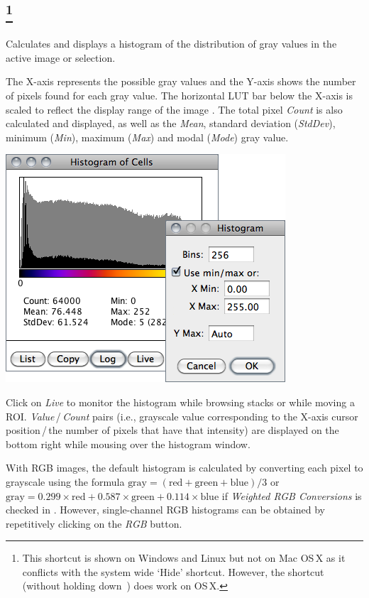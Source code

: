 \subsection[{\protect\userinterface{Histogram {[}h{]}}}]{\protect{}%
\footnote{This shortcut is shown on Windows and Linux but not on Mac OS\,X
as it conflicts with the system wide `Hide' shortcut. However, the
\protect{} shortcut (without holding down \protect{}\,)
does work on OS\,X.%
}\label{sub:Histogram}}

Calculates and displays a histogram of the distribution of gray values
in the active image or selection.

The X-axis represents the possible gray values and the Y-axis shows
the number of pixels found for each gray value. The horizontal LUT
bar below the X-axis is scaled to reflect the display range of the
image \cite{C-Histogram}. The total pixel \emph{Count} is also calculated
and displayed, as well as the \emph{Mean}, standard deviation (\emph{StdDev}),
minimum (\emph{Min}), maximum (\emph{Max}) and modal (\emph{Mode})
gray value.

\begin{minipage}[c][1\totalheight][t]{0.537\columnwidth}%
\includegraphics[scale=0.55]{images/Histogram}%
\end{minipage}%
\begin{minipage}[c][1\totalheight][t]{0.463\columnwidth}%
Click on \emph{Live} to monitor the histogram while browsing stacks
or while moving a ROI.\emph{ Value}\,/\,\emph{Count} pairs (i.e.,
grayscale value corresponding to the X-axis cursor position\,/\,the
number of pixels that have that intensity) are displayed on the bottom
right while mousing over the histogram window.

\medskip{}
With RGB images, the default histogram is calculated
by converting each pixel to grayscale using the formula $\text{gray}=(\text{red}+\text{green}+\text{blue})/3$
or $\text{gray}=0.299\times\text{red}+0.587\times\text{green}+0.114\times\text{blue}$
if \emph{Weighted RGB Conversions} is checked in .
However, single-channel RGB histograms can be obtained by repetitively
clicking on the \emph{RGB} button.%
\end{minipage}

